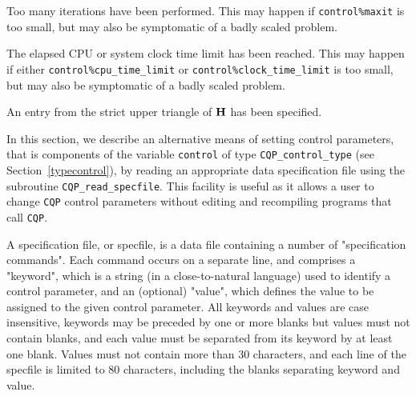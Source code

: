 \documentclass{galahad}
\newcommand{\packagename}{CQP}
\begin{document}
\begin{description}
 Too many iterations have been performed.
   This may happen if
    {\tt control\%maxit} is too small, but may also be symptomatic of
    a badly scaled problem.

 The elapsed CPU or system clock time limit has been
    reached. This may happen if either {\tt control\%cpu\_time\_limit} or
    {\tt control\%clock\_time\_limit} is too small, but may also be symptomatic
    of a badly scaled problem.

 An entry from the strict upper triangle of ${\mathbf{H}}$
 has been specified.

\end{description}


\galfeatures
\noindent In this section, we describe an alternative means of setting
control parameters, that is components of the variable {\tt control} of type
{\tt \packagename\_control\_type}
(see Section~\ref{typecontrol}),
by reading an appropriate data specification file using the
subroutine {\tt \packagename\_read\_specfile}. This facility
is useful as it allows a user to change  {\tt \packagename} control parameters
without editing and recompiling programs that call {\tt \packagename}.

A specification file, or specfile, is a data file containing a number of
"specification commands". Each command occurs on a separate line,
and comprises a "keyword",
which is a string (in a close-to-natural language) used to identify a
control parameter, and
an (optional) "value", which defines the value to be assigned to the given
control parameter. All keywords and values are case insensitive,
keywords may be preceded by one or more blanks but
values must not contain blanks, and
each value must be separated from its keyword by at least one blank.
Values must not contain more than 30 characters, and
each line of the specfile is limited to 80 characters,
including the blanks separating keyword and value.
\end{document}

